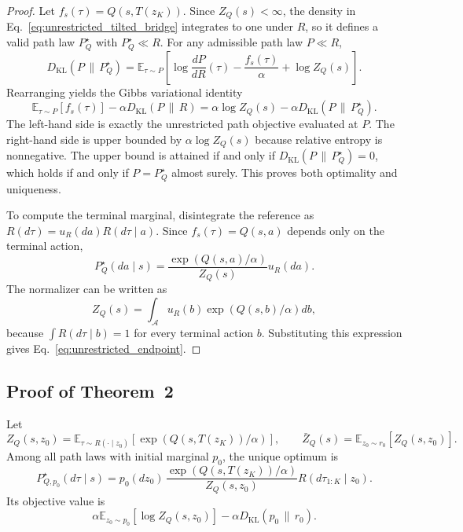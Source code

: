 \documentclass[11pt]{article}
\begin{document}
\begin{proof}
Let $f_s(\tau)=Q(s,T(z_K))$. Since $Z_Q(s)<\infty$, the density in Eq.~\eqref{eq:unrestricted_tilted_bridge} integrates to one under $R$, so it defines a valid path law $P_Q^\star$ with $P_Q^\star\ll R$. For any admissible path law $P\ll R$,
\begin{equation}
  D_{\mathrm{KL}}
  \left(
    P
    \,\|\,P_Q^\star
  \right)
  =
  \mathbb E_{\tau\sim P}
  \left[
    \log\frac{dP}{dR}(\tau)
    -
    \frac{f_s(\tau)}{\alpha}
    +
    \log Z_Q(s)
  \right].
\end{equation}
Rearranging yields the Gibbs variational identity
\begin{equation}
  \mathbb E_{\tau\sim P}[f_s(\tau)]
  -
  \alpha
  D_{\mathrm{KL}}
  \left(
    P
    \,\|\,R
  \right)
  =
  \alpha\log Z_Q(s)
  -
  \alpha
  D_{\mathrm{KL}}
  \left(
    P
    \,\|\,P_Q^\star
  \right).
\end{equation}
The left-hand side is exactly the unrestricted path objective evaluated at $P$. The right-hand side is upper bounded by $\alpha\log Z_Q(s)$ because relative entropy is nonnegative. The upper bound is attained if and only if $D_{\mathrm{KL}}(P\,\|\,P_Q^\star)=0$, which holds if and only if $P=P_Q^\star$ almost surely. This proves both optimality and uniqueness.

To compute the terminal marginal, disintegrate the reference as $R(d\tau)=u_R(da)R(d\tau\mid a)$. Since $f_s(\tau)=Q(s,a)$ depends only on the terminal action,
\begin{equation}
  P_Q^\star(da\mid s)
  =
  \frac{
    \exp(Q(s,a)/\alpha)
  }{
    Z_Q(s)
  }
  u_R(da).
\end{equation}
The normalizer can be written as
\begin{equation}
  Z_Q(s)
  =
  \int_{\mathcal A}
  u_R(b)
  \exp(Q(s,b)/\alpha)
  db,
\end{equation}
because $\int R(d\tau\mid b)=1$ for every terminal action $b$. Substituting this expression gives Eq.~\eqref{eq:unrestricted_endpoint}.
\end{proof}

\subsection{Proof of Theorem~2}
\label{app:proof_fixed_base_optimum}

\begin{restatement}
Let
\[
  Z_Q(s,z_0)
  =
  \mathbb E_{\tau\sim R(\cdot\mid z_0)}
  \left[
    \exp
    \left(
      Q(s,T(z_K))/\alpha
    \right)
  \right],
  \qquad
  \bar Z_Q(s)
  =
  \mathbb E_{z_0\sim r_0}
  \left[
    Z_Q(s,z_0)
  \right].
\]
Among all path laws with initial marginal $p_0$, the unique optimum is
\[
  P_{Q,p_0}^\star(d\tau\mid s)
  =
  p_0(dz_0)\,
  \frac{
    \exp
    \left(
      Q(s,T(z_K))/\alpha
    \right)
  }{
    Z_Q(s,z_0)
  }
  R(d\tau_{1:K}\mid z_0).
\]
Its objective value is
\[
  \alpha
  \mathbb E_{z_0\sim p_0}
  \left[
    \log Z_Q(s,z_0)
  \right]
  -
  \alpha
  D_{\mathrm{KL}}
  \left(
    p_0
    \,\|\,
    r_0
  \right).
\]

\end{restatement}
\end{document}
